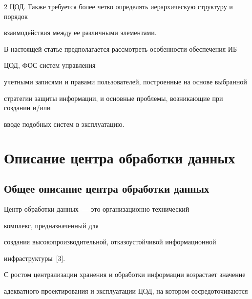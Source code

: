 \begin{multicols}{2}
ЦОД. Также требуется более четко определять иерархическую структуру и порядок 


взаимодействия между ее различными элементами.


       


       В настоящей статье предполагается рас\-смот\-реть особенности обеспечения ИБ 


ЦОД, ФОС сис\-тем управ\-ле\-ния 


учетными записями и правами пользователей, построенные на основе выбранной 


стратегии защиты информации, и основные проблемы, воз\-ни\-ка\-ющие при создании и/или 


вводе подобных сис\-тем в эксплуатацию.





\vspace*{-6pt}





\section{Описание центра обработки данных}





\vspace*{-2pt}





\subsection{Общее описание центра обработки данных}


       


       Центр обработки данных~--- это ор\-га\-ни\-за\-ци\-он\-но-тех\-ни\-че\-ский 


       комплекс, предназначенный для 


создания высокопроизводительной, отказоустойчивой информационной 


инфраструктуры~[3].


       


       С ростом централизации хранения и обработки информации возрастает значение 


адекватного проектирования и эксплуатации ЦОД, на котором сосредоточиваются 



\end{multicols}
